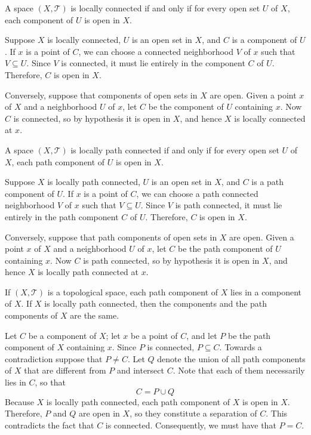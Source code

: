 \documentclass[12pt, a4paper, twoside, openright, titlepage]{book}
\begin{document}
\begin{thm}{}{}
    A space $(X,\mathcal{T})$ is locally connected if and only if for every open set $U$ of $X$, each component of $U$ is open in $X$.
\end{thm}
\begin{proof*}{}{}
    Suppose $X$ is locally connected, $U$ is an open set in $X$, and $C$ is a component of $U$. If $x$ is a point of $C$, we can choose a connected neighborhood $V$ of $x$ such that $V \subseteq U$. Since $V$ is connected, it must lie entirely in the component $C$ of $U$. Therefore, $C$ is open in $X$.

    Conversely, suppose that components of open sets in $X$ are open. Given a point $x$ of $X$ and a neighborhood $U$ of $x$, let $C$ be the component of $U$ containing $x$. Now $C$ is connected, so by hypothesis it is open in $X$, and hence $X$ is locally connected at $x$.
\end{proof*}

\begin{thm}{}{}
    A space $(X,\mathcal{T})$ is locally path connected if and only if for every open set $U$ of $X$, each path component of $U$ is open in $X$.
\end{thm}
\begin{proof*}{}{}
    Suppose $X$ is locally path connected, $U$ is an open set in $X$, and $C$ is a path component of $U$. If $x$ is a point of $C$, we can choose a path connected neighborhood $V$ of $x$ such that $V \subseteq U$. Since $V$ is path connected, it must lie entirely in the path component $C$ of $U$. Therefore, $C$ is open in $X$.

    Conversely, suppose that path components of open sets in $X$ are open. Given a point $x$ of $X$ and a neighborhood $U$ of $x$, let $C$ be the path component of $U$ containing $x$. Now $C$ is path connected, so by hypothesis it is open in $X$, and hence $X$ is locally path connected at $x$.
\end{proof*}


\begin{thm}{}{}
    If $(X,\mathcal{T})$ is a topological space, each path component of $X$ lies in a component of $X$. If $X$ is locally path connected, then the components and the path components of $X$ are the same.
\end{thm}
\begin{proof*}{}{}
    Let $C$ be a component of $X$; let $x$ be a point of $C$, and let $P$ be the path component of $X$ containing $x$. Since $P$ is connected, $P\subseteq C$. Towards a contradiction suppose that $P \neq C$. Let $Q$ denote the union of all path components of $X$ that are different from $P$ and intersect $C$. Note that each of them necessarily lies in $C$, so that \begin{equation*}
        C = P\cup Q
    \end{equation*}
    Because $X$ is locally path connected, each path component of $X$ is open in $X$. Therefore, $P$ and $Q$ are open in $X$, so they constitute a separation of $C$. This contradicts the fact that $C$ is connected. Consequently, we must have that $P = C$.
\end{proof*}
\end{document}
